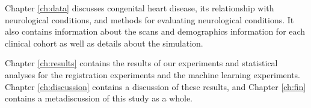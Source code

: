 Chapter \ref{ch:data} discusses congenital heart disease, its relationship with neurological conditions, and methods for evaluating neurological conditions. It also contains information about the scans and demographics information for each clinical cohort as well as details about the simulation. 

Chapter \ref{ch:results} contains the results of our experiments and statistical analyses for the registration experiments and the machine learning experiments. Chapter \ref{ch:discussion} contains a discussion of these results, and Chapter \ref{ch:fin} contains a metadiscussion of this study as a whole.